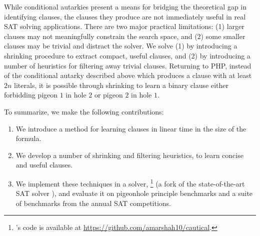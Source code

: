 While conditional autarkies present a means for bridging the theoretical gap in
identifying \pr clauses, the \pr clauses they produce are not immediately useful
in real SAT solving applications. There are two major practical limitations: (1)
larger \pr clauses may not meaningfully constrain the search space, and (2) some
smaller \pr clauses may be trivial and distract the solver. We solve (1) by
introducing a shrinking procedure to extract compact, useful \pr clauses, and
(2) by introducing a number of heuristics for filtering away trivial \pr
clauses. Returning to PHP, instead of the conditional autarky described above
which produces a clause with at least $2n$ literals, it is possible through
shrinking to learn a binary \pr clause either forbidding pigeon $1$ in hole $2$ or
pigeon $2$ in hole $1$.


To summarize, we make the following contributions: 

\begin{enumerate} 
    \item We introduce a method for learning \pr clauses in linear time in the
    size of the formula. 
    \item We develop a number of shrinking and filtering heuristics, to learn
    concise and useful \pr clauses.%
    \item We implement these techniques in a solver, \tool\footnote{\tool's code
    is available at \url{https://github.com/amarshah10/cautical}.} (a fork of
    the state-of-the-art SAT solver \cadical), and evaluate it on pigeonhole 
    principle benchmarks and a suite of benchmarks from the annual SAT competitions.
\end{enumerate}